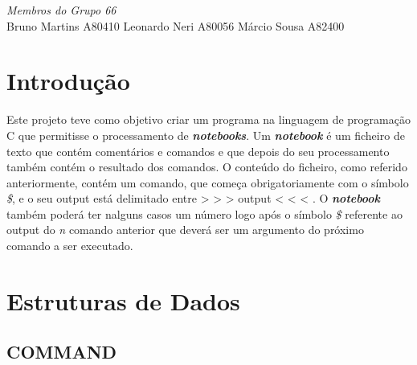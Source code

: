 \begin{titlepage}
\Large \emph{Membros do Grupo 66}\\
Bruno Martins A80410
Leonardo Neri A80056
Márcio Sousa A82400




 

\vfill %

\end{titlepage}

\section{Introdução}
Este projeto teve como objetivo criar um programa na linguagem de programação C que permitisse o processamento de \textbf{\textit{notebooks}}. Um \textbf{\textit{notebook}} é um ficheiro de texto que contém comentários e comandos e que depois do seu processamento também contém o resultado dos comandos.
O conteúdo do ficheiro, como referido anteriormente, contém um comando, que começa obrigatoriamente com o símbolo \textit{\$}, e o seu output está delimitado entre > > > output < < < . O \textbf{\textit{notebook}} também poderá ter nalguns casos um número logo após o símbolo \textit{\$} referente ao output do \textit{n} comando anterior que deverá ser um argumento do próximo comando a ser executado. 

\section{Estruturas de Dados}



\subsection{COMMAND}

